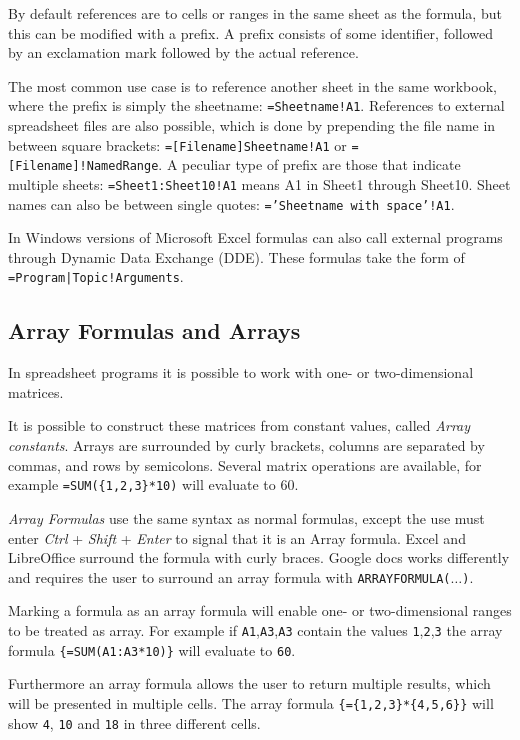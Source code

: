 \documentclass[conference]{IEEEtran}
\begin{document}
By default references are to cells or ranges in the same sheet as the formula, but this can be modified with a prefix. A prefix consists of some identifier, followed by an exclamation mark followed by the actual reference.

The most common use case is to reference another sheet in the same workbook, where the prefix is simply the sheetname: \texttt{=Sheetname!A1}. References to external spreadsheet files are also possible, which is done by prepending the file name in between square brackets: \texttt{=[Filename]Sheetname!A1} or \texttt{=[Filename]!NamedRange}.
A peculiar type of prefix are those that indicate multiple sheets: \texttt{=Sheet1:Sheet10!A1} means A1 in Sheet1 through Sheet10.
Sheet names can also be between single quotes: \texttt{='Sheetname with space'!A1}. 

In Windows versions of Microsoft Excel formulas can also call external programs through Dynamic Data Exchange (DDE).
These formulas take the form of \texttt{=Program|Topic!Arguments}.

\subsection{Array Formulas and Arrays}
\label{sec:arrayformulas}
In spreadsheet programs it is possible to work with one- or two-dimensional matrices.

It is possible to construct these matrices from constant values, called \emph{Array constants}.
Arrays are surrounded by curly brackets, columns are separated by commas, and rows by semicolons.
Several matrix operations are available, for example \texttt{=SUM(\{1,2,3\}*10)} will evaluate to 60.

\emph{Array Formulas} use the same syntax as normal formulas, except the use must enter \emph{Ctrl} + \emph{Shift} + \emph{Enter} to signal that it is an Array formula.
Excel and LibreOffice surround the formula with curly braces.
Google docs works differently and requires the user to surround an array formula with \texttt{ARRAYFORMULA($\ldots$)}.

Marking a formula as an array formula will enable one- or two-dimensional ranges to be treated as array.
For example if \texttt{A1},\texttt{A3},\texttt{A3} contain the values \texttt{1},\texttt{2},\texttt{3} the array formula \texttt{\{=SUM(A1:A3*10)\}} will evaluate to \texttt{60}.

Furthermore an array formula allows the user to return multiple results, which will be presented in multiple cells.
The array formula \texttt{\{=\{1,2,3\}*\{4,5,6\}\}} will show \texttt{4}, \texttt{10} and \texttt{18} in three different cells.
\end{document}
